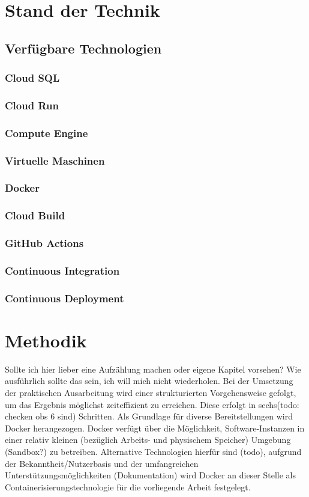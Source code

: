 \documentclass[pdftex,a4paper,abstracton,11pt,parskip=half,bibtotocnumbered]{scrartcl}
\begin{document}
\section{Stand der Technik}
	
	\subsection{Verfügbare Technologien}
		\subsubsection{Cloud SQL}
		\subsubsection{Cloud Run}
		\subsubsection{Compute Engine}
		\subsubsection{Virtuelle Maschinen}
		\subsubsection{Docker}
		\subsubsection{Cloud Build}
		\subsubsection{GitHub Actions}
		\subsubsection{Continuous Integration}
		\subsubsection{Continuous Deployment}

\section{Methodik}
	Sollte ich hier lieber eine Aufzählung machen oder eigene Kapitel vorsehen? Wie ausführlich sollte das sein, ich will mich nicht wiederholen. 
	Bei der Umsetzung der praktischen Ausarbeitung wird einer strukturierten Vorgehensweise gefolgt, um das Ergebnis möglichst zeiteffizient zu 
	erreichen. Diese erfolgt in sechs(todo: checken obs 6 sind) Schritten.
	Als Grundlage für diverse Bereitstellungen wird Docker herangezogen. Docker verfügt über die Möglichkeit, Software-Instanzen in einer relativ kleinen 
	(bezüglich Arbeits- und physischem Speicher) Umgebung (Sandbox?) zu betreiben. Alternative Technologien hierfür sind (todo), aufgrund der 
	Bekanntheit/Nutzerbasis und der	umfangreichen Unterstützungsmöglichkeiten (Dokumentation) wird Docker an dieser Stelle als Containerisierungstechnologie
	für die vorliegende Arbeit festgelegt.  
\end{document}
